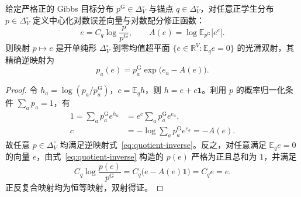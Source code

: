 \documentclass[lang=cn,scheme=chinese,openany]{elegantbook}
\newcommand{\E}{\mathbb E}
\newcommand{\R}{\mathbb R}
\begin{document}
\begin{theorem}[归一化分布与中心化误差向量的一一对应]
\label{thm:quotient-bijection}
给定严格正的 Gibbs 目标分布 $p^{\mathrm G}\in\Delta_V^\circ$ 与锚点 $q\in\Delta_V^\circ$，对任意正学生分布 $p\in\Delta_V^\circ$ 定义中心化对数误差向量与对数配分修正函数：
\begin{equation}
e=C_q\log\frac{p}{p^{\mathrm G}},\qquad
A(e)=\log\E_{p^{\mathrm G}}\bigl[e^{e}\bigr].
\end{equation}
则映射 $p\mapsto e$ 是开单纯形 $\Delta_V^\circ$ 到零均值超平面 $\{e\in\R^V:\E_q e=0\}$ 的光滑双射，其精确逆映射为
\begin{equation}
p_a(e)=p_a^{\mathrm G}\exp\bigl(e_a-A(e)\bigr).
\label{eq:quotient-inverse}
\end{equation}
\end{theorem}
\begin{proof}
令 $h_a=\log(p_a/p_a^{\mathrm G})$，$c=\E_q h$，则 $h=e+c\mathbf1$。利用 $p$ 的概率归一化条件 $\sum_a p_a=1$，有
\begin{align}
1=\sum_a p_a^{\mathrm G}e^{h_a}&=e^c\sum_a p_a^{\mathrm G}e^{e_a},\\
c&=-\log\sum_a p_a^{\mathrm G}e^{e_a}=-A(e).
\end{align}
故任意 $p\in\Delta_V^\circ$ 均满足逆映射式~\eqref{eq:quotient-inverse}。反之，对任意满足 $\E_q e=0$ 的向量 $e$，由式~\eqref{eq:quotient-inverse} 构造的 $p(e)$ 严格为正且总和为 $1$，并满足
\begin{equation}
C_q\log\frac{p(e)}{p^{\mathrm G}}=C_q\bigl(e-A(e)\mathbf1\bigr)=C_q e=e.
\end{equation}
正反复合映射均为恒等映射，双射得证。
\end{proof}
\end{document}
